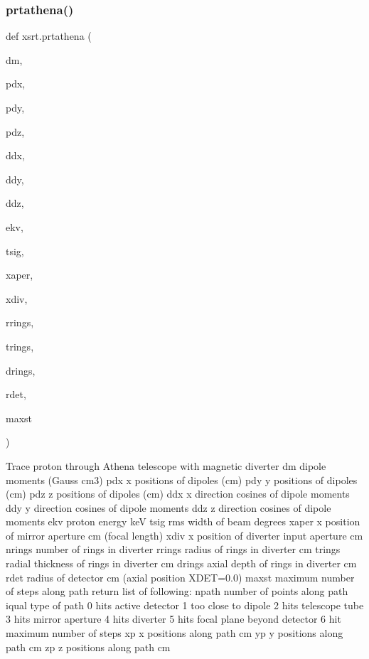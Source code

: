 \subsubsection{\texorpdfstring{prtathena()}{prtathena()}}
{\footnotesize\ttfamily def xsrt.\+prtathena (\begin{DoxyParamCaption}\item[{}]{dm,  }\item[{}]{pdx,  }\item[{}]{pdy,  }\item[{}]{pdz,  }\item[{}]{ddx,  }\item[{}]{ddy,  }\item[{}]{ddz,  }\item[{}]{ekv,  }\item[{}]{tsig,  }\item[{}]{xaper,  }\item[{}]{xdiv,  }\item[{}]{rrings,  }\item[{}]{trings,  }\item[{}]{drings,  }\item[{}]{rdet,  }\item[{}]{maxst }\end{DoxyParamCaption})}

\begin{DoxyVerb}Trace proton through Athena telescope with magnetic diverter
    dm     dipole moments (Gauss cm3)
    pdx    x positions of dipoles (cm)
    pdy    y positions of dipoles (cm)
    pdz    z positions of dipoles (cm)
    ddx    x direction cosines of dipole moments
    ddy    y direction cosines of dipole moments
    ddz    z direction cosines of dipole moments
    ekv    proton energy keV
    tsig   rms width of beam degrees
    xaper  x position of mirror aperture cm (focal length)
    xdiv   x position of diverter input aperture cm
    nrings number of rings in diverter
    rrings radius of rings in diverter cm
    trings radial thickness of rings in diverter cm
    drings axial depth of rings in diverter cm
    rdet   radius of detector cm (axial position XDET=0.0)
    maxst  maximum number of steps along path
return list of following:
    npath  number of points along path
    iqual  type of path
            0 hits active detector
            1 too close to dipole
            2 hits telescope tube
            3 hits mirror aperture
            4 hits diverter
            5 hits focal plane beyond detector
            6 hit maximum number of steps
    xp      x positions along path cm
    yp      y positions along path cm
    zp      z positions along path cm
\end{DoxyVerb}
 \mbox{\label{namespacexsrt_abf9930353fb8dbb6e2a53a8c0894b53a}} 
